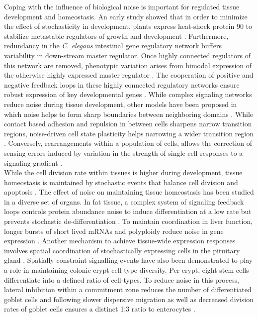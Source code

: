 Coping with the influence of biological noise is important for regulated tissue development and homeostasis. An early study showed that in order to minimize the effect of stochasticity in development, plants express heat-shock protein 90 to stabilize metastable regulators of growth and development \citep{Queitsch2002}. Furthermore, redundancy in the \textit{C. elegans} intestinal gene regulatory network buffers variability in down-stream master regulator. Once highly connected regulators of this network are removed, phenotypic variation arises from bimodal expression of the otherwise highly expressed master regulator \citep{Raj2010}. The cooperation of positive and negative feedback loops in these highly connected regulatory networks ensure robust expression of key developmental genes \citep{Ji2013}. While complex signaling networks reduce noise during tissue development, other models have been proposed in which noise helps to form sharp boundaries between neighboring domains \citep{Zhang2012}. While contact based adhesion and repulsion in between cells sharpens narrow transition regions, noise-driven cell state plasticity helps narrowing a wider transition region \citep{Wang2017}. Conversely, rearrangements within a population of cells, allows the correction of sensing errors induced by variation in the strength of single cell responses to a signaling gradient \citep{Camley2017}.\\
While the cell division rate within tissues is higher during development, tissue homeostasis is maintained by stochastic events that balance cell division and apoptosis \citep{Ranft2010}. The effect of noise on maintaining tissue homeostasis has been studied in a diverse set of organs. In fat tissue, a complex system of signaling feedback loops controls protein abundance noise to induce differentiation at a low rate but prevents stochastic de-differentiation \citep{Ahrends2014}. To maintain coordination in liver function, longer bursts of short lived mRNAs and polyploidy reduce noise in gene expression \citep{BaharHalpern2015}. Another mechanism to achieve tissue-wide expression responses involves spatial coordination of stochastically expressing cells in the pituitary gland \citep{Featherstone2016}. Spatially constraint signalling events have also been demonstrated to play a role in maintaining colonic crypt cell-type diversity. Per crypt, eight stem cells differentiate into a defined ratio of cell-types. To reduce noise in this process, lateral inhibition within a commitment zone reduces the number of differentiated goblet cells and following slower dispersive migration as well as decreased division rates of goblet cells ensures a distinct 1:3 ratio to enterocytes \citep{Toth2017}.

